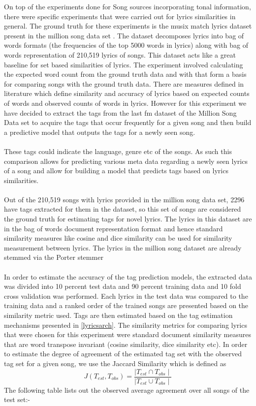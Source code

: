 \noindent On top of the experiments done for Song sources incorporating tonal information, there were specific experiments that were carried out for lyrics similarities in general. The ground truth for these experiments is the musix match lyrics dataset present in the million song data set \cite{msd}. The dataset decomposes lyrics into bag of words formats (the frequencies of the top 5000 words in lyrics) along with bag of words representation of 210,519 lyrics of songs. This dataset acts like a great baseline for set based similarities of lyrics. The experiment involved calculating the expected word count from the ground truth data and with that form a basis for comparing songs with the ground truth data. There are measures defined in literature \cite{lyricsRanking} which define similarity and accuracy of lyrics based on expected counts of words and observed counts of words in lyrics. However for this experiment we have decided to extract the tags from the last fm dataset of the Million Song Data set \cite{msd} to acquire the tags that occur frequently for a given song and then build a predictive model that outputs the tags for a newly seen song. \\\\
These tags could indicate the language, genre etc of the songs. As such this comparison allows for predicting various meta data regarding a newly seen lyrics of a song and allow for building a model that predicts tags based on lyrics similarities. \\\\
Out of the 210,519 songs with lyrics provided in the million song data set, 2296 have tags extracted for them in the dataset, so this set of songs are considered the ground truth for estimating tags for novel lyrics. The lyrics in this dataset are in the bag of words document representation format and hence standard similarity measures like cosine and dice similarity can be used for similarity measurement between lyrics. The lyrics in the million song dataset are already stemmed via the Porter stemmer \cite{msd} \\\\
In order to estimate the accuracy of the tag prediction models, the extracted data was divided into 10 percent test data and 90 percent training data and 10 fold cross validation was performed. Each lyrics in the test data was compared to the training data and a ranked order of the trained songs are presented based on the similarity metric used. Tags are then estimated based on the tag estimation mechanisms presented in \ref{lyricsarch}. The similarity metrics for comparing lyrics that were chosen for this experiment were standard document similarity measures that are word transpose invariant (cosine similarity, dice similarity etc). In order to estimate the degree of agreement of the estimated tag set with the observed tag set for a given song, we use the Jaccard Similarity which is defined as 
\begin{equation}
J(T_{est}, T_{obs}) = \frac{\mid T_{est} \cap T_{obs} \mid}{\mid T_{est} \cup T_{obs} \mid}
\end{equation}
The following table lists out the observed average agreement over all songs of the test set:-\\

